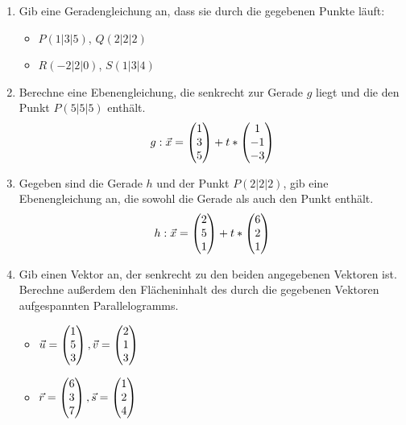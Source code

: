 \begin{multicols}{2}
	\begin{enumerate}
		\item Gib eine Geradengleichung an, dass sie durch die gegebenen Punkte läuft:
		\begin{itemize}
			\item $P(1|3|5)$, $Q(2|2|2)$
			\item $R(-2|2|0)$, $S(1|3|4)$
		\end{itemize}
		\item Berechne eine Ebenengleichung, die senkrecht zur Gerade $g$ liegt und die den Punkt $P(5|5|5)$ enthält.
		\begin{equation*}
			g:\vec x=\begin{pmatrix} 1\\3\\5 \end{pmatrix}+t*\begin{pmatrix} 1\\-1\\-3 \end{pmatrix}
		\end{equation*}
		\item Gegeben sind die Gerade $h$ und der Punkt $P(2|2|2)$, gib eine Ebenengleichung an, die sowohl die Gerade als auch den Punkt enthält.
		\begin{equation*}
			h:\vec x=\begin{pmatrix} 2\\5\\1 \end{pmatrix}+t*\begin{pmatrix} 6\\2\\1 \end{pmatrix}
		\end{equation*}
		\item Gib einen Vektor an, der senkrecht zu den beiden angegebenen Vektoren ist. Berechne außerdem den Flächeninhalt des durch die gegebenen Vektoren aufgespannten Parallelogramms.
		\begin{itemize}
			\item$\vec u=\begin{pmatrix} 1\\5\\3 \end{pmatrix},\vec v=\begin{pmatrix} 2\\1\\3 \end{pmatrix}$
			\item$\vec r=\begin{pmatrix} 6\\3\\7 \end{pmatrix},\vec s=\begin{pmatrix} 1\\2\\4 \end{pmatrix}$
		\end{itemize}
	\end{enumerate}
\end{multicols}
